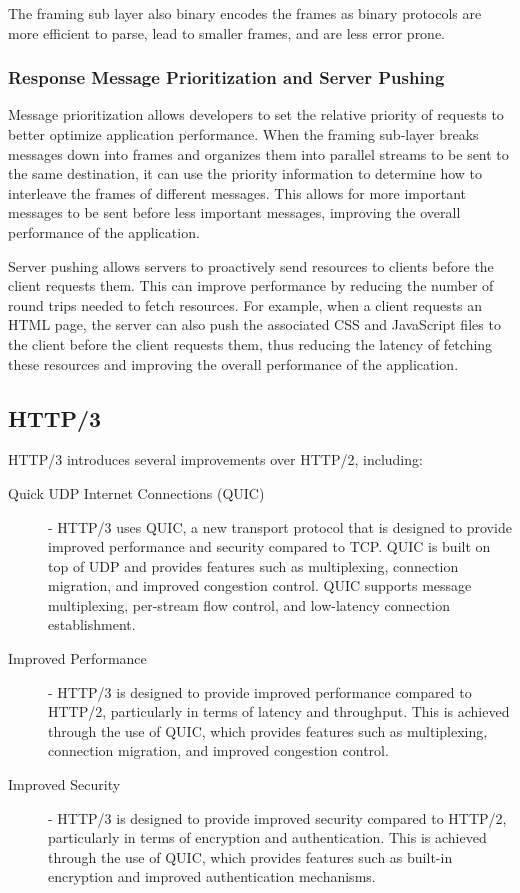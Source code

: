 \documentclass[12pt letter]{report}
\begin{document}
The framing sub layer also binary encodes the frames as binary
protocols are more efficient to parse, lead to smaller frames, and
are less error prone.

\subsubsection{Response Message Prioritization and Server Pushing}

Message prioritization allows developers to set the relative priority
of requests to better optimize application performance. When the
framing sub-layer breaks messages down into frames and organizes them
into parallel streams to be sent to the same destination, it can use
the priority information to determine how to interleave the frames of
different messages. This allows for more important messages to be
sent before less important messages, improving the overall
performance of the application.

Server pushing allows servers to proactively send resources to
clients before the client requests them. This can improve performance
by reducing
the number of round trips needed to fetch resources. For example,
when a client requests an HTML page, the server can also push the
associated CSS and JavaScript files to the client before the client
requests them, thus reducing the latency of fetching these resources
and improving the overall performance of the application.

\subsection{HTTP/3}

HTTP/3 introduces several improvements over HTTP/2, including:
\begin{description}
  \item[Quick UDP Internet Connections (QUIC)]  - HTTP/3 uses QUIC, a
    new transport
    protocol that is designed to provide improved performance and
    security compared to TCP. QUIC is built on top of UDP and provides
    features such as multiplexing, connection migration, and improved
    congestion control. QUIC supports message multiplexing,
    per-stream flow control, and low-latency connection establishment.
  \item[Improved Performance] - HTTP/3 is designed to provide improved
    performance compared to HTTP/2, particularly in terms of latency and
    throughput. This is achieved through the use of QUIC, which provides
    features such as multiplexing, connection migration, and improved
    congestion control.
  \item[Improved Security] - HTTP/3 is designed to provide improved security
    compared to HTTP/2, particularly in terms of encryption and
    authentication. This is achieved through the use of QUIC, which provides
    features such as built-in encryption and improved authentication mechanisms.
\end{description}
\end{document}
